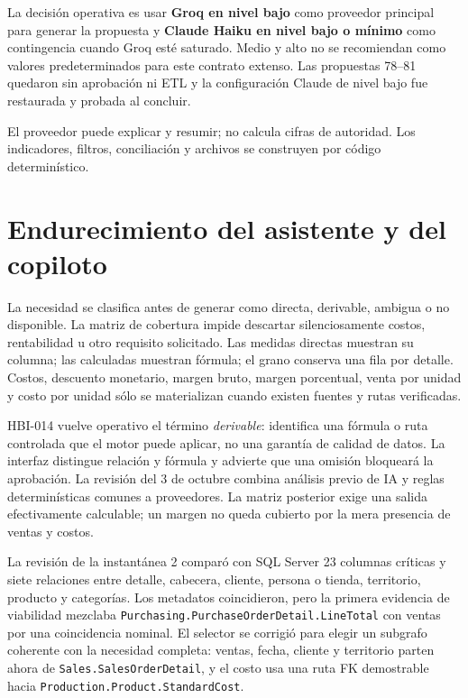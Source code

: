 \documentclass[11pt,letterpaper]{article}
\newcommand{\file}[1]{\texttt{#1}}
\begin{document}
La decisión operativa es usar \textbf{Groq en nivel bajo} como proveedor principal para generar la propuesta y \textbf{Claude Haiku en nivel bajo o mínimo} como contingencia cuando Groq esté saturado. Medio y alto no se recomiendan como valores predeterminados para este contrato extenso. Las propuestas 78--81 quedaron sin aprobación ni ETL y la configuración Claude de nivel bajo fue restaurada y probada al concluir.

El proveedor puede explicar y resumir; no calcula cifras de autoridad. Los indicadores, filtros, conciliación y archivos se construyen por código determinístico.

\section{Endurecimiento del asistente y del copiloto}

La necesidad se clasifica antes de generar como directa, derivable, ambigua o no disponible. La matriz de cobertura impide descartar silenciosamente costos, rentabilidad u otro requisito solicitado. Las medidas directas muestran su columna; las calculadas muestran fórmula; el grano conserva una fila por detalle. Costos, descuento monetario, margen bruto, margen porcentual, venta por unidad y costo por unidad sólo se materializan cuando existen fuentes y rutas verificadas.

HBI-014 vuelve operativo el término \emph{derivable}: identifica una fórmula o ruta
controlada que el motor puede aplicar, no una garantía de calidad de datos. La interfaz
distingue relación y fórmula y advierte que una omisión bloqueará la aprobación.
La revisión del 3 de octubre combina análisis previo de IA y reglas determinísticas
comunes a proveedores. La matriz posterior exige una salida efectivamente calculable;
un margen no queda cubierto por la mera presencia de ventas y costos.

La revisión de la instantánea 2 comparó con SQL Server 23 columnas críticas y siete relaciones entre detalle, cabecera, cliente, persona o tienda, territorio, producto y categorías. Los metadatos coincidieron, pero la primera evidencia de viabilidad mezclaba \file{Purchasing.PurchaseOrderDetail.LineTotal} con ventas por una coincidencia nominal. El selector se corrigió para elegir un subgrafo coherente con la necesidad completa: ventas, fecha, cliente y territorio parten ahora de \file{Sales.SalesOrderDetail}, y el costo usa una ruta FK demostrable hacia \file{Production.Product.StandardCost}.
\end{document}
